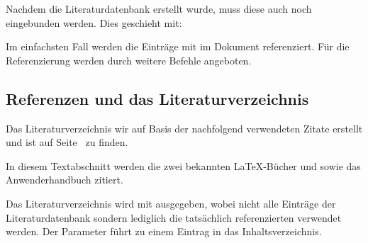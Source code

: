 \documentclass[%
  english,ngerman,%
  cdgeometry=no,DIV=12,automark,%
]{tudscrartcl}
\begin{document}
%
Nachdem die Literaturdatenbank erstellt wurde, muss diese auch noch eingebunden 
werden. Dies geschieht mit:
%
\begin{Preamble}


\end{Preamble}
%
Im einfachsten Fall werden die Einträge mit  im 
Dokument referenziert. Für die Referenzierung werden durch  
weitere Befehle angeboten.
%
\begin{refsection}
\begin{Trunk+}
\section{Referenzen und das Literaturverzeichnis}
Das Literaturverzeichnis wir auf Basis der nachfolgend verwendeten 
Zitate erstellt und ist auf Seite~\pageref{sec:bibliography} zu finden.
\end{Trunk+}
\begin{Trunk*}
In diesem Textabschnitt werden die zwei bekannten \LaTeX-Bücher
\cite{knuth84} und \cite{goossens94} sowie das Anwenderhandbuch
\cite{hanisch14} zitiert.

\end{Trunk*}
%
Das Literaturverzeichnis wird mit  ausgegeben, wobei 
nicht alle Einträge der Literaturdatenbank sondern lediglich die tatsächlich 
referenzierten verwendet werden. Der Parameter  führt 
zu einem Eintrag in das Inhaltsverzeichnis.
%
\begin{Hint}
\printbibliography[heading=bibintoc]
\end{Hint}
\begin{quoting}[rightmargin=0pt]
\makeatletter
\let\markboth\@gobbletwo
\let\markright\@gobble
\makeatother
\vspace*{-\baselineskipglue}
\printbibliography
\end{quoting}
\end{refsection}
\end{document}
